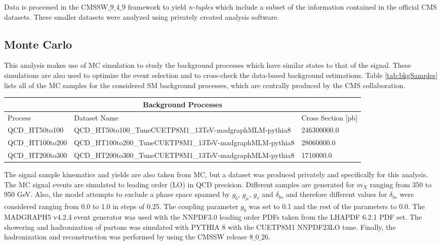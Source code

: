  Data is processed in the CMSSW$\_$9$\_$4$\_$9 framework to yield \textit{n-tuples} which include a subset of the information contained in the official CMS datasets. These smaller datasets were analyzed using privately created analysis software.

\subsection{Monte Carlo}

This analysis makes use of MC simulation to study the background processes which have similar states to that of the signal. These simulations are also used to optimize the event selection and to cross-check the data-based background estimations. Table \ref{tab:bkgSamples} lists all of the MC samples for the considered SM background processes, which are centrally produced by the CMS collaboration.


\begin{sidewaystable}[hbtp]\footnotesize
	\centering
	\begin{tabular}{l p{} l}
		\hline
		\multicolumn{3}{c}{Background Processes} \\
		\hline
		Process & Dataset Name & Cross Section [pb] \\
		\hline
		QCD\_HT50to100 & QCD\_HT50to100\_TuneCUETP8M1\_13TeV-madgraphMLM-pythia8 & 246300000.0 \\
		QCD\_HT100to200 & QCD\_HT100to200\_TuneCUETP8M1\_13TeV-madgraphMLM-pythia8 & 28060000.0\\
		QCD\_HT200to300 & QCD\_HT200to300\_TuneCUETP8M1\_13TeV-madgraphMLM-pythia8 & 1710000.0 \\
		\hline
	\end{tabular}
	\caption{List of background MC datasets and cross sections used in the analysis. Every dataset name is followed by /RunIISummer16MiniAODv2-PUMoriond17\_80X\_mcRun2\_asymptotic\_2016\_TrancheIV\_v6-v1/MINIAODSIM.}
	\label{tab:bkgSamples}
\end{sidewaystable}

The signal sample kinematics and yields are also taken from MC, but a dataset was produced privately and specifically for this analysis. The MC signal events are simulated to leading order (LO) in QCD precision. Different samples are generated for $m_{X}$ ranging from 350 to 950 GeV. Also, the model attempts to exclude a phase space spanned by $g_{b}$, $g_{\mu}$, $g_{\tau}$ and $\delta_{bs}$ and therefore different values for $\delta_{bs}$ were considered ranging from 0.0 to 1.0 in steps of 0.25. The coupling parameter $g_{b}$ was set to 0.1 and the rest of the parameters to 0.0.  The MADGRAPH5 v4.2.4 event generator was used with the NNPDF3.0 leading order PDFs taken from the LHAPDF 6.2.1 PDF set. The showering and hadronization of partons was simulated with PYTHIA 8 with the CUETP8M1 NNPDF23LO tune. Finally, the hadronization and reconstruction was performed by using the CMSSW release 8$\_$0$\_$26.

